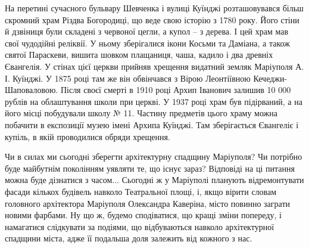 На перетині сучасного бульвару Шевченка і вулиці Куїнджі розташовувався більш
скромний храм Різдва Богородиці, що веде свою історію з 1780 року. Його стіни
й дзвіниця були складені з червоної цегли, а купол – з дерева. І цей храм мав
свої чудодійні реліквії. У ньому зберігалися ікони Косьми та Даміана, а також
святої Параскеви, вишита шовком плащаниця, чаша, кадило і два древніх
Євангелія. У стінах цієї церкви прийняв хрещення видатний земляк Маріуполя А.
І. Куїнджі. У 1875 році там же він обвінчався з Вірою Леонтіївною
Кечеджи-Шаповаловою. Після своєї смерті в 1910 році Архип Іванович залишив 10
000 рублів на облаштування школи при церкві. У 1937 році храм був підірваний,
а на його місці побудували школу № 11. Частину предметів цього храму можна
побачити в експозиції музею імені Архипа Куїнджі. Там зберігається Євангеліє і
купіль, в якій проводилися обряди хрещення.

Чи в силах ми сьогодні зберегти архітектурну спадщину Маріуполя? Чи потрібно
буде майбутнім поколінням уявляти те, що існує зараз? Відповіді на ці питання
можна буде дізнатися з часом... Сьогодні ж у Маріуполі планують відремонтувати
фасади кількох будівель навколо Театральної площі, і, якщо вірити словам
головного архітектора Маріуполя Олександра Каверіна, місто повинно заграти
новими фарбами. Ну що ж, будемо сподіватися, що кращі зміни попереду, і
намагатися слідкувати за подіями, що відбуваються навколо архітектурної
спадщини міста, адже її подальша доля залежить від кожного з нас.
